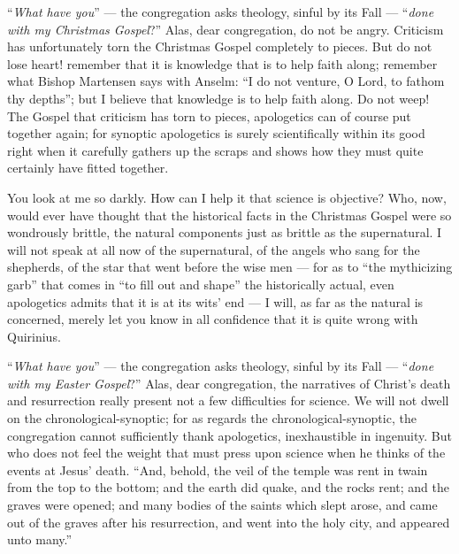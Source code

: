 \documentclass[12pt]{book}
\newcommand{\opage}[1]{\marginnote{\footnotesize\textit{[#1]}}}
\begin{document}
``\emph{What have you}'' --- the congregation asks theology, sinful by its Fall --- ``\emph{done with my Christmas Gospel}?'' Alas, dear congregation, do not be angry. Criticism has unfortunately torn the Christmas Gospel completely to pieces. But do not lose heart! remember that it is knowledge that is to help faith along; remember what Bishop Martensen says with Anselm: ``I do not venture, O Lord, to fathom thy depths''; but I believe that knowledge is to help faith along. Do not weep! The Gospel that criticism has torn to pieces, apologetics can of course put together again; for synoptic apologetics is surely scientifically within its good right when it carefully gathers up the scraps and shows how they must quite certainly have fitted together.

You look at me so darkly. How can I help it that science is objective? Who, now, would ever have thought that the historical facts in the Christmas Gospel were so wondrously brittle, the natural components just as brittle as the supernatural. I will not speak at all now of the supernatural, of the angels who sang for the shepherds, of the star that went before the wise men --- for as to ``the mythicizing garb'' that comes in ``to fill out and shape'' the historically actual, even apologetics admits that it is at its wits' end --- I will, as far as the natural is
\opage{50}\setcounter{footnote}{0}%
concerned, merely let you know in all confidence that it is quite wrong with Quirinius.

``\emph{What have you}'' --- the congregation asks theology, sinful by its Fall --- ``\emph{done with my Easter Gospel}?'' Alas, dear congregation, the narratives of Christ's death and resurrection really present not a few difficulties for science. We will not dwell on the chronological-synoptic; for as regards the chronological-synoptic, the congregation cannot sufficiently thank apologetics, inexhaustible in ingenuity. But who does not feel the weight that must press upon science when he thinks of the events at Jesus' death. ``And, behold, the veil of the temple was rent in twain from the top to the bottom; and the earth did quake, and the rocks rent; and the graves were opened; and many bodies of the saints which slept arose, and came out of the graves after his resurrection, and went into the holy city, and appeared unto many.''
\end{document}
